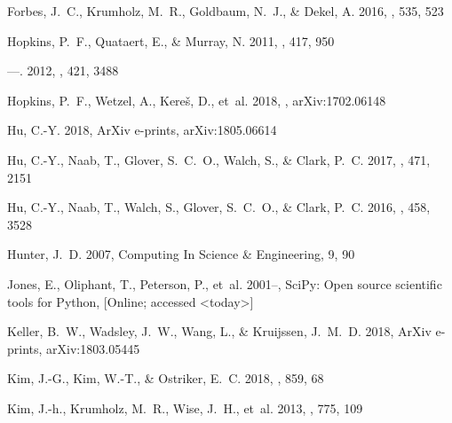 \documentclass[twocolumn]{aastex62}
\begin{document}
\begin{thebibliography}{}
{Forbes}, J.~C., {Krumholz}, M.~R., {Goldbaum}, N.~J., \& {Dekel}, A. 2016,
  \nat, 535, 523

{Hopkins}, P.~F., {Quataert}, E., \& {Murray}, N. 2011, \mnras, 417, 950

---. 2012, \mnras, 421, 3488

{Hopkins}, P.~F., {Wetzel}, A., {Kere{\v s}}, D., {et~al.} 2018, \mnras,
  arXiv:1702.06148

{Hu}, C.-Y. 2018, ArXiv e-prints, arXiv:1805.06614

{Hu}, C.-Y., {Naab}, T., {Glover}, S.~C.~O., {Walch}, S., \& {Clark}, P.~C.
  2017, \mnras, 471, 2151

{Hu}, C.-Y., {Naab}, T., {Walch}, S., {Glover}, S.~C.~O., \& {Clark}, P.~C.
  2016, \mnras, 458, 3528

Hunter, J.~D. 2007, Computing In Science \& Engineering, 9, 90

Jones, E., Oliphant, T., Peterson, P., {et~al.} 2001--, {SciPy}: Open source
  scientific tools for {Python}, [Online; accessed <today>]

{Keller}, B.~W., {Wadsley}, J.~W., {Wang}, L., \& {Kruijssen}, J.~M.~D. 2018,
  ArXiv e-prints, arXiv:1803.05445

{Kim}, J.-G., {Kim}, W.-T., \& {Ostriker}, E.~C. 2018, \apj, 859, 68

{Kim}, J.-h., {Krumholz}, M.~R., {Wise}, J.~H., {et~al.} 2013, \apj, 775, 109


\end{thebibliography}
\end{document}
